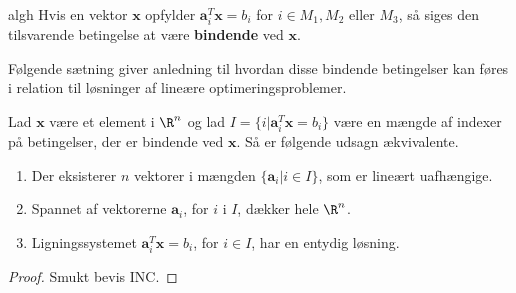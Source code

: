 \begin{defn}{}{algh}
Hvis en vektor $\textbf{x}$ opfylder $\textbf{a}^T_i\textbf{x}= b_i$ for $i \in M_1, M_2 \text{ eller } M_3$, så siges den tilsvarende betingelse at være \textbf{bindende} ved $\textbf{x}$.
\end{defn}\noindent
%
Følgende sætning giver anledning til hvordan disse bindende betingelser kan føres i relation til løsninger af lineære optimeringsproblemer.
%
\begin{thm}{}{}

Lad $\textbf{x}$ være et element i $\R^n$ og lad $I=\{i|\textbf{a}^T_i\textbf{x}=b_i\}$ være en mængde af indexer på betingelser, der er bindende ved $\textbf{x}$.
Så er følgende udsagn ækvivalente.
%
\begin{enumerate}[label=(\alph*)]
\item Der eksisterer $n$ vektorer i mængden $\{\textbf{a}_i|i \in I \}$, som er lineært uafhængige.
\item Spannet af vektorerne $\textbf{a}_i$, for $i$ i $I$, dækker hele $\R^n$.
\item Ligningssystemet $\textbf{a}^T_i\textbf{x}= b_i$, for $i \in I$, har en entydig løsning.
\end{enumerate}
\end{thm}
%
\begin{proof}
Smukt bevis INC.
\end{proof}